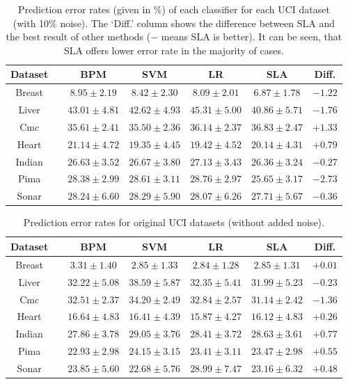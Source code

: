 \begin{table}[htbp!]
\centering
\begin{tabular}{|cc|  ccc|c|c|}
\hline\hline
{\bf Dataset} && {\bf BPM} & {\bf SVM} & {\bf LR} & {\bf SLA} & {\bf Diff.}\\  
\hline
Breast && $8.95 \pm 2.19$ & $8.42 \pm 2.30$ & $8.09 \pm 2.01$ & $6.87 \pm 1.78$ & $-1.22$\\  
Liver && $43.01 \pm 4.81$ & $42.62 \pm 4.93$ & $45.31 \pm 5.00$ & $40.86 \pm 5.71$ & $-1.76$\\  
Cmc && $35.61 \pm 2.41$ & $35.50 \pm 2.36$ & $36.14 \pm 2.37$ & $36.83 \pm 2.47$ & $+1.33$\\  
Heart && $21.14 \pm 4.72$ & $19.35 \pm 4.45$ & $19.42 \pm 4.52$ & $20.14 \pm 4.31$ & $+0.79$\\  
Indian && $26.63 \pm 3.52$ & $26.67 \pm 3.80$ & $27.13 \pm 3.43$ & $26.36 \pm 3.24$ & $-0.27$\\  
Pima && $28.38 \pm 2.99$ & $28.61 \pm 3.11$ & $28.76 \pm 2.97$ & $25.65 \pm 3.17$ & $-2.73$\\  
Sonar && $28.24 \pm 6.60$ & $28.29 \pm 5.90$ & $28.07 \pm 6.26$ & $27.71 \pm 5.67$ & $-0.36$\\[1ex]   
\hline\hline
\end{tabular}
\caption{Prediction error rates (given in \%) of each classifier for
  each UCI dataset (with 10\% noise). The `Diff.' column shows the
  difference between SLA and the best result of other methods ($-$
  means SLA is better). It can be seen, that SLA offers lower error
  rate in the majority of cases.}
\label{tab:ucierrorrates}
\end{table}

\begin{table}[htbp!]
\centering
\begin{tabular}{|cc|  ccc|c|c|}
\hline\hline
{\bf Dataset} && {\bf BPM} & {\bf SVM} & {\bf LR} & {\bf SLA} & {\bf Diff.}\\    
\hline
Breast && $3.31 \pm 1.40$ & $2.85 \pm 1.33$ & $2.84 \pm 1.28$ & $2.85 \pm 1.31$ & $+0.01$\\  
Liver && $32.22 \pm 5.08$ & $38.59 \pm 5.87$ & $32.35 \pm 5.41$ & $31.99 \pm 5.23$ & $-0.23$\\  
Cmc && $32.51 \pm 2.37$ & $34.20 \pm 2.49$ & $32.84 \pm 2.57$ & $31.14 \pm 2.42$ & $-1.36$\\  
Heart && $16.64 \pm 4.83$ & $16.41 \pm 4.39$ & $15.87 \pm 4.27$ & $16.12 \pm 4.83$ & $+0.26$\\  
Indian && $27.86 \pm 3.78$ & $29.05 \pm 3.76$ & $28.41 \pm 3.72$ & $28.63 \pm 3.61$ & $+0.77$\\  
Pima && $22.93 \pm 2.98$ & $24.15 \pm 3.15$ & $23.41 \pm 3.11$ & $23.47 \pm 2.98$ & $+0.55$\\  
Sonar && $23.85 \pm 5.60$ & $22.68 \pm 5.76$ & $28.99 \pm 7.47$ & $23.16 \pm 6.32$ & $+0.48$\\[1ex]   
\hline\hline
\end{tabular}
\caption{Prediction error rates for original UCI datasets (without
  added noise).}
\label{tab:ucierrorrates2}
\end{table}

